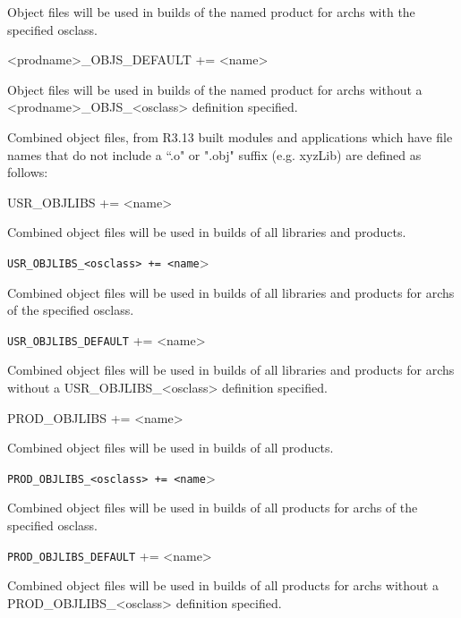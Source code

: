 \begin{description}
Object files will be used in builds of the named product for archs with the specified osclass.

\item \textless{}prodname\textgreater{}\_OBJS\_DEFAULT += \textless{}name\textgreater{}

Object files will be used in builds of the named product for archs without a \textless{}prodname\textgreater{}\_OBJS\_\textless{}osclass\textgreater{} 
definition specified.

Combined object files, from R3.13 built modules and applications which have file names that do not include a ``.o" or 
".obj" suffix (e.g. xyzLib) are defined as follows:

\item {}USR\_OBJLIBS += \textless{}name\textgreater{}

Combined object files will be used in builds of all libraries and products.

\item \verb|USR_OBJLIBS_<osclass> += <name|\textgreater{}

Combined object files will be used in builds of all libraries and products for archs of the specified osclass.

\item \verb|USR_OBJLIBS_DEFAULT| += \textless{}name\textgreater{}

Combined object files will be used in builds of all libraries and products for archs without a 
USR\_OBJLIBS\_\textless{}osclass\textgreater{} definition specified.

\item

\item {}PROD\_OBJLIBS += \textless{}name\textgreater{}

Combined object files will be used in builds of all products.

\item \verb|PROD_OBJLIBS_<osclass> += <name|\textgreater{}

Combined object files will be used in builds of all products for archs of the specified osclass.

\item \verb|PROD_OBJLIBS_DEFAULT| += \textless{}name\textgreater{}

Combined object files will be used in builds of all products for archs without a PROD\_OBJLIBS\_\textless{}osclass\textgreater{} 
definition specified.


\end{description}
